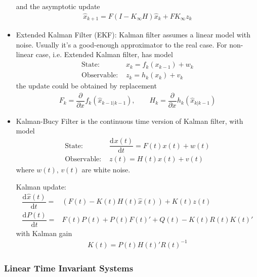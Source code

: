 \begin{itemize}[topsep=2pt,itemsep=0pt]
    and the asymptotic update
    \begin{align}
        \hat{x}_{k+1}=F\left(I-K_\infty H\right)\hat{x}_k+ FK_\infty z_k 
    \end{align}
    
    \item Extended Kalman Filter (EKF): Kalman filter assumes a linear model with noise. Usually it's a good-enough approximator to the real case. For non-linear case, i.e. Extended Kalman filter, has model
    \begin{align}
         \text{State: }&x_k=f_k(x_{k-1})+w_k\\
         \text{Observable: }&z_k=h_k(x_k)+v_k
    \end{align}
    the update could be obtained by replacement
    \begin{align}
         F_k=\dfrac{\partial^{}  }{\partial x ^{}}f_k\left(\hat{x}_{k-1|k-1}\right),\qquad H_k=\dfrac{\partial^{} }{\partial x^{}}h_k\left(\hat{x}_{k|k-1}\right)
    \end{align}
    \item Kalman-Bucy Filter is the continuous time version of Kalman filter, with model
    \begin{align}
        \text{State: }&\dfrac{\mathrm{d}^{} x(t)}{\mathrm{d}t^{}}=F(t)x(t)+w(t)\\
        \text{Observable: }&z(t)=H(t)x(t)+v(t)
    \end{align}
    where $ w(t),\,v(t) $ are white noise.

    Kalman update:
    \begin{align}
        \dfrac{\mathrm{d}^{} \hat{x}(t)}{\mathrm{d}t^{}}=&\left( F(t)-K(t)H(t)\hat{x}(t) \right)+K(t)z(t)\\
        \dfrac{\mathrm{d}^{}P(t) }{\mathrm{d}t}=&F(t)P(t)+P(t)F(t)'+Q(t)-K(t)R(t)K(t)'
    \end{align}
    with Kalman gain
    \begin{align}
        K(t)=P(t)H(t)'R(t)^{-1} 
    \end{align}
    
    
\end{itemize}

    

\subsubsection{Linear Time Invariant Systems}

